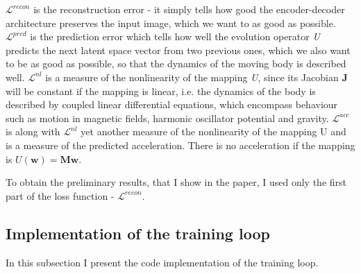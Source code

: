 \documentclass[12pt,letterpaper]{article}
\newcommand{\txt}[1]{\textit{#1}}
\begin{document}
$\mathcal{L}^{recon}$ is the reconstruction error - it simply tells how good the encoder-decoder architecture preserves the input image, which we want to as good as possible. $\mathcal{L}^{pred}$ is the prediction error which tells how well the evolution operator \txt{U} predicts the next latent space vector from two previous ones, which we also want to be as good as possible, so that the dynamics of the moving body is described well. $\mathcal{L}^{nl}$ is a measure of the nonlinearity of the mapping \txt{U}, since its Jacobian $\boldsymbol{J}$ will be constant if the mapping is linear, i.e. the dynamics of the body is described by coupled linear differential equations, which encompass behaviour such as motion in magnetic fields, harmonic oscillator potential and gravity. $\mathcal{L}^{acc}$ is along with $\mathcal{L}^{nl}$ yet another measure of the nonlinearity of the mapping U and is a measure of the predicted acceleration. There is no acceleration if the mapping is $U(\boldsymbol{w}) = \boldsymbol{M}\boldsymbol{w}$.

To obtain the preliminary results, that I show in the paper, I used only the first part of the loss function - $\mathcal{L}^{recon}$.

\subsection{Implementation of the training loop}
\label{subs:implement_train_loop}

In this subsection I present the code implementation of the training loop. 
\end{document}
